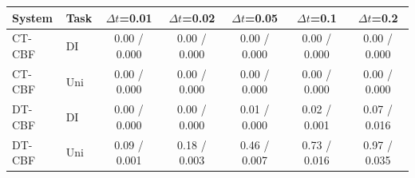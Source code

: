 \begin{tabular}{llccccc}
\hline
System & Task & $\Delta t$=0.01 & $\Delta t$=0.02 & $\Delta t$=0.05 & $\Delta t$=0.1 & $\Delta t$=0.2 \\
\hline
CT-CBF & DI & 0.00 / 0.000 & 0.00 / 0.000 & 0.00 / 0.000 & 0.00 / 0.000 & 0.00 / 0.000 \\
CT-CBF & Uni & 0.00 / 0.000 & 0.00 / 0.000 & 0.00 / 0.000 & 0.00 / 0.000 & 0.00 / 0.000 \\
DT-CBF & DI & 0.00 / 0.000 & 0.00 / 0.000 & 0.01 / 0.000 & 0.02 / 0.001 & 0.07 / 0.016 \\
DT-CBF & Uni & 0.09 / 0.001 & 0.18 / 0.003 & 0.46 / 0.007 & 0.73 / 0.016 & 0.97 / 0.035 \\
\hline
\end{tabular}
